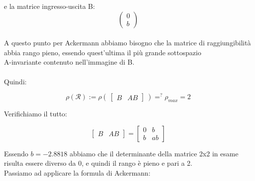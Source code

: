\documentclass[a4paper,13pt]{article}
\begin{document}
	e la matrice ingresso-uscita B:          %
\begin{equation*}
\begin{pmatrix}

	0\\b

\end{pmatrix}
\end{equation*} \\


	A questo punto per Ackermann abbiamo bisogno che la matrice di raggiungibilità abbia rango pieno, essendo quest'ultima 	il più grande sottospazio \\A-invariante contenuto nell'immagine di B.\\ \\
	Quindi:
	
\begin{equation*}
	\rho(\mathcal{R}):=
\rho(\:\begin{bmatrix}

	B&AB

\end{bmatrix}\:)=^{?}\rho_{max}=2
\end{equation*}

	Verifichiamo il tutto:
	
\begin{equation*}
\begin{bmatrix}

	B&AB

\end{bmatrix} =              %
\begin{bmatrix}

	0&b\\b&ab

\end{bmatrix}
\end{equation*}

	Essendo $b=-2.8818$ abbiamo che il determinante della matrice  2x2 in esame risulta essere diverso da 0,
	e quindi il rango è pieno e pari a 2.\\
	Passiamo ad applicare la formula di Ackermann:
	
\end{document}
